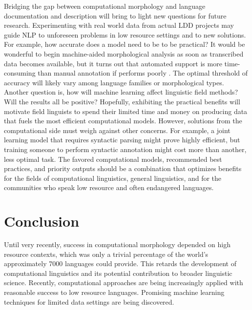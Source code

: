 \documentclass[12pt]{article}
\begin{document}
Bridging the gap between computational morphology and language documentation and description will bring to light new questions for future research. Experimenting with real world data from actual LDD projects may guide NLP to unforeseen problems in low resource settings and to new solutions. For example, how accurate does a model need to be to be practical? It would be wonderful to begin machine-aided morphological analysis as soon as transcribed data becomes available, but it turns out that automated support is more time-consuming than manual annotation if performs poorly \cite{kothur_document-level_2018,palmer_semi-automated_2009}. The optimal threshold of accuracy will likely vary among language families or morphological types. Another question is, how will machine learning affect linguistic field methods? Will the results all be positive? Hopefully, exhibiting the practical benefits will motivate field linguists to spend their limited time and money on producing data that fuels the most efficient computational models. However, solutions from the computational side must weigh against other concerns. For example, a joint learning model that requires syntactic parsing might prove highly efficient, but training someone to perform syntactic annotation might cost more than another, less optimal task. The favored computational models, recommended best practices, and priority outputs should be a combination that optimizes benefits for the fields of computational linguistics, general linguistics, and for the communities who speak low resource and often endangered languages. 

\section{Conclusion}

Until very recently, success in computational morphology depended on high resource contexts, which was only a trivial percentage of the world’s approximately 7000 languages could provide. This retards the development of computational linguistics and its potential contribution to broader linguistic science. Recently, computational approaches are being increasingly applied with reasonable success to low resource languages. Promising machine learning techniques for limited data settings are being discovered. 
\end{document}
